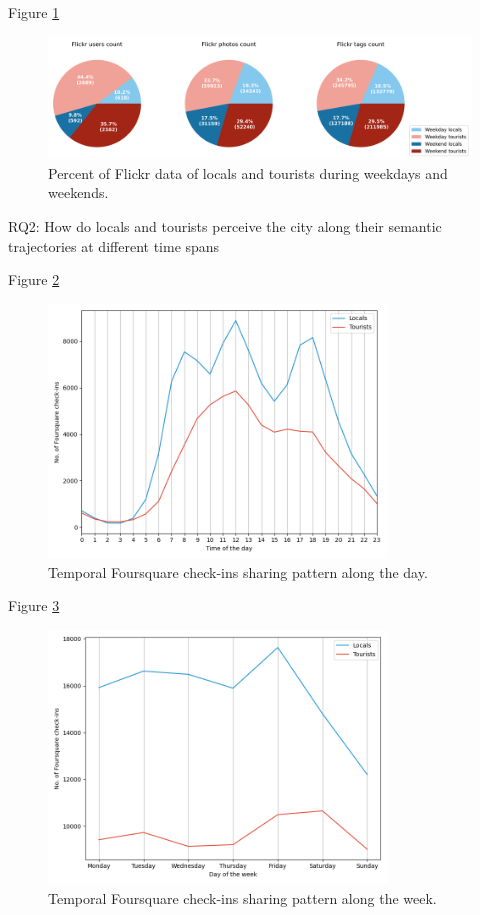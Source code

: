 \documentclass{article}
\begin{document}
Figure \ref{fig:flickr_week_count_pie}
\begin{figure}
\centering
\includegraphics[width=1.13\textwidth]{figures/flickr_week_count_pie.png}
\caption{\label{fig:flickr_week_count_pie}Percent of Flickr data of locals and tourists during weekdays and weekends.}
\end{figure}


RQ2: How do locals and tourists perceive the city along their semantic trajectories at different time spans

Figure \ref{fig:foursquare_trend_day}
\begin{figure}
\centering
\includegraphics[width=0.8\textwidth]{figures/foursquare_trend_day.png}
\caption{\label{fig:foursquare_trend_day}Temporal Foursquare check-ins sharing pattern along the day.}
\end{figure}

Figure \ref{fig:foursquare_trend_week}
\begin{figure}
\centering
\includegraphics[width=0.8\textwidth]{figures/foursquare_trend_week.png}
\caption{\label{fig:foursquare_trend_week}Temporal Foursquare check-ins sharing pattern along the week.}
\end{figure}
\end{document}
